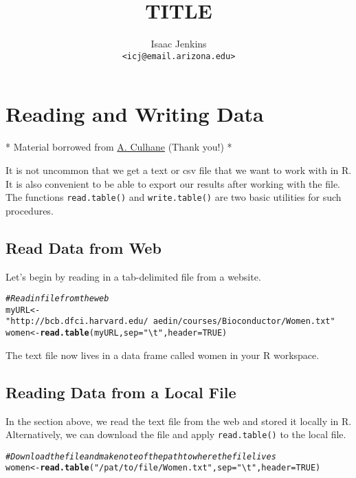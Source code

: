 \documentclass[12pt]{article}\usepackage[]{graphicx}\usepackage[]{color}
\title{TITLE}
\author{Isaac Jenkins \\ {\tt <icj@email.arizona.edu>}}
\makeatletter
\newcommand{\hlnum}[1]{\textcolor[rgb]{0.686,0.059,0.569}{#1}}%
\newcommand{\hlstr}[1]{\textcolor[rgb]{0.192,0.494,0.8}{#1}}%
\newcommand{\hlcom}[1]{\textcolor[rgb]{0.678,0.584,0.686}{\textit{#1}}}%
\newcommand{\hlstd}[1]{\textcolor[rgb]{0.345,0.345,0.345}{#1}}%
\newcommand{\hlkwb}[1]{\textcolor[rgb]{0.69,0.353,0.396}{#1}}%
\newcommand{\hlkwc}[1]{\textcolor[rgb]{0.333,0.667,0.333}{#1}}%
\newcommand{\hlkwd}[1]{\textcolor[rgb]{0.737,0.353,0.396}{\textbf{#1}}}%
\newenvironment{kframe}{%
 \def\at@end@of@kframe{}%
 \ifinner\ifhmode%
  \def\at@end@of@kframe{\end{minipage}}%
  \begin{minipage}{\columnwidth}%
 \fi\fi%
 \def\FrameCommand##1{\hskip\@totalleftmargin \hskip-\fboxsep
 \colorbox{shadecolor}{##1}\hskip-\fboxsep
     \hskip-\linewidth \hskip-\@totalleftmargin \hskip\columnwidth}%
 \MakeFramed {\advance\hsize-\width
   \@totalleftmargin\z@ \linewidth\hsize
   \@setminipage}}%
 {\par\unskip\endMakeFramed%
 \at@end@of@kframe}
\newenvironment{knitrout}{}{} %
\newcommand{\ttt}{\texttt}
\makeatother
\begin{document}

\section*{Reading and Writing Data}

* Material borrowed from 
\href{http://bcb.dfci.harvard.edu/~aedin/courses/Bioconductor/}{A. Culhane} 
(Thank you!) * 

It is not uncommon that we get a text or csv file that we want to work with 
in R. It is also convenient to be able to export our results after working 
with the file. The functions \ttt{read.table()} and \ttt{write.table()} are 
two basic utilities for such procedures. 

\subsection*{Read Data from Web}
Let's begin by reading in a tab-delimited file from a website.

\begin{knitrout}
\color{fgcolor}\begin{kframe}
\begin{alltt}
\hlcom{# Read in file from the web}
\hlstd{myURL} \hlkwb{<-} \hlstr{"http://bcb.dfci.harvard.edu/~aedin/courses/Bioconductor/Women.txt"}
\hlstd{women} \hlkwb{<-} \hlkwd{read.table}\hlstd{(myURL,} \hlkwc{sep} \hlstd{=} \hlstr{"\textbackslash{}t"}\hlstd{,} \hlkwc{header} \hlstd{=} \hlnum{TRUE}\hlstd{)}
\end{alltt}
\end{kframe}
\end{knitrout}


The text file now lives in a data frame called women in your R workspace.

\subsection*{Reading Data from a Local File}
In the section above, we read the text file from the web and stored it locally 
in R. Alternatively, we can download the file and apply \ttt{read.table()} to 
the local file.

\begin{knitrout}
\color{fgcolor}\begin{kframe}
\begin{alltt}
\hlcom{# Download the file and make note of the path to where the file lives}
\hlstd{women} \hlkwb{<-} \hlkwd{read.table}\hlstd{(}\hlstr{"/pat/to/file/Women.txt"}\hlstd{,} \hlkwc{sep} \hlstd{=} \hlstr{"\textbackslash{}t"}\hlstd{,} \hlkwc{header} \hlstd{=} \hlnum{TRUE}\hlstd{)}
\end{alltt}
\end{kframe}
\end{knitrout}
\end{document}
